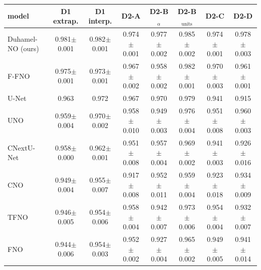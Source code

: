 \begin{tabular}{lccccccc}
\toprule
model & D1 extrap. & D1 interp. & D2-A & D2-B$_\alpha$ & D2-B$_{\mathrm{units}}$ & D2-C & D2-D \\
\midrule
Duhamel-NO (ours) & 0.981{\scriptsize$\pm$0.001} & 0.982{\scriptsize$\pm$0.001} & 0.974{\scriptsize$\pm$0.001} & 0.977{\scriptsize$\pm$0.002} & 0.985{\scriptsize$\pm$0.002} & 0.974{\scriptsize$\pm$0.001} & 0.978{\scriptsize$\pm$0.003} \\
F-FNO & 0.975{\scriptsize$\pm$0.001} & 0.973{\scriptsize$\pm$0.001} & 0.967{\scriptsize$\pm$0.002} & 0.958{\scriptsize$\pm$0.002} & 0.982{\scriptsize$\pm$0.001} & 0.970{\scriptsize$\pm$0.003} & 0.961{\scriptsize$\pm$0.001} \\
U-Net & 0.963 & 0.972 & 0.967 & 0.970 & 0.979 & 0.941 & 0.915 \\
UNO & 0.959{\scriptsize$\pm$0.004} & 0.970{\scriptsize$\pm$0.002} & 0.958{\scriptsize$\pm$0.010} & 0.949{\scriptsize$\pm$0.003} & 0.976{\scriptsize$\pm$0.004} & 0.951{\scriptsize$\pm$0.008} & 0.960{\scriptsize$\pm$0.003} \\
CNextU-Net & 0.958{\scriptsize$\pm$0.000} & 0.962{\scriptsize$\pm$0.001} & 0.951{\scriptsize$\pm$0.008} & 0.957{\scriptsize$\pm$0.004} & 0.969{\scriptsize$\pm$0.002} & 0.941{\scriptsize$\pm$0.003} & 0.926{\scriptsize$\pm$0.016} \\
CNO & 0.949{\scriptsize$\pm$0.004} & 0.955{\scriptsize$\pm$0.007} & 0.917{\scriptsize$\pm$0.008} & 0.952{\scriptsize$\pm$0.011} & 0.959{\scriptsize$\pm$0.004} & 0.923{\scriptsize$\pm$0.018} & 0.934{\scriptsize$\pm$0.009} \\
TFNO & 0.946{\scriptsize$\pm$0.005} & 0.954{\scriptsize$\pm$0.006} & 0.958{\scriptsize$\pm$0.004} & 0.942{\scriptsize$\pm$0.007} & 0.973{\scriptsize$\pm$0.006} & 0.954{\scriptsize$\pm$0.004} & 0.932{\scriptsize$\pm$0.007} \\
FNO & 0.944{\scriptsize$\pm$0.006} & 0.954{\scriptsize$\pm$0.003} & 0.952{\scriptsize$\pm$0.002} & 0.927{\scriptsize$\pm$0.004} & 0.965{\scriptsize$\pm$0.002} & 0.949{\scriptsize$\pm$0.005} & 0.941{\scriptsize$\pm$0.014} \\
\bottomrule
\end{tabular}